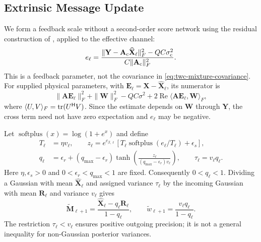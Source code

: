 \subsection{Extrinsic Message Update}

We form a feedback scale without a second-order score network using
the residual construction of \cite[eq.~(12)]{wei2026}, applied to the
effective channel:
\begin{equation}
 e_\ell=\frac{\|\mathbf Y-\mathbf A_{\rm c}\widehat{\mathbf X}_\ell\|_F^2
                   -QC\sigma_{\rm c}^2}
                  {C\|\mathbf A_{\rm c}\|_F^2}.
 \label{eq:twc-residual-scale}
\end{equation}
This is a feedback parameter, not the covariance in
\eqref{eq:twc-mixture-covariance}. For supplied physical parameters,
with $\mathbf E_\ell=\mathbf X-\widehat{\mathbf X}_\ell$, its numerator is
\begin{equation}
 \|\mathbf A\mathbf E_\ell\|_F^2+
 \|\mathbf W\|_F^2-QC\sigma^2+
 2\operatorname{Re}\langle\mathbf A\mathbf E_\ell,\mathbf W\rangle_F,
 \label{eq:twc-residual-expansion}
\end{equation}
where $\langle U,V\rangle_F=\operatorname{tr}(U^{\mathsf H}V)$.
Since the estimate depends on $\mathbf W$ through $\mathbf Y$,
the cross term need not have zero expectation and $e_\ell$ may be negative.

Let $\operatorname{softplus}(x)=\log(1+e^x)$ and define
\begin{align}
 T_\ell&=\eta v_\ell,\qquad
 z_\ell=e^{c_{\beta,\ell}}
 [T_\ell\operatorname{softplus}(e_\ell/T_\ell)+\epsilon_s],
 \label{eq:twc-positive-scale}\\
 q_\ell&=\epsilon_r+(q_{\max}-\epsilon_r)
 \tanh\!\left(\frac{z_\ell}{(q_{\max}-\epsilon_r)v_\ell}\right),
 \qquad \tau_\ell=v_\ell q_\ell.
 \label{eq:twc-feedback-ratio}
\end{align}
Here $\eta,\epsilon_s>0$ and $0<\epsilon_r<q_{\max}<1$ are fixed.
Consequently $0<q_\ell<1$. Dividing a Gaussian with mean
$\widehat{\mathbf X}_\ell$ and assigned variance $\tau_\ell$ by the
incoming Gaussian with mean $\mathbf R_\ell$ and variance $v_\ell$ gives
\begin{equation}
 \widetilde{\mathbf M}_{\ell+1}
 =\frac{\widehat{\mathbf X}_\ell-q_\ell\mathbf R_\ell}{1-q_\ell},
 \qquad \widetilde w_{\ell+1}=\frac{v_\ell q_\ell}{1-q_\ell}.
 \label{eq:twc-feedback-proposal}
\end{equation}
The restriction $\tau_\ell<v_\ell$ ensures positive outgoing precision;
it is not a general inequality for non-Gaussian posterior variances.

